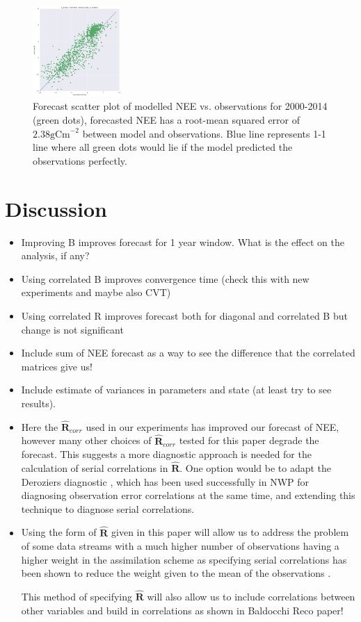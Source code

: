 \documentclass[11pt]{article}
\begin{document}
\begin{figure}[ht]
    \centering
    \includegraphics[width=0.3\textwidth]{b_edcr_corr_cor03_tau4_cutoff4_var05_forecast_scatter.png}
    \caption{Forecast scatter plot of modelled NEE vs. observations for 2000-2014 (green dots), forecasted NEE has a root-mean squared error of $2.38 \text{gCm}^{-2}$ between model and observations. Blue line represents 1-1 line where all green dots would lie if the model predicted the observations perfectly.}
    \label{fig:forecastscatedcBcorR}
\end{figure}



\section{Discussion}

\begin{itemize}
\item Improving B improves forecast for 1 year window. What is the effect on the analysis, if any?
\item Using correlated B improves convergence time (check this with new experiments and maybe also CVT)
\item Using correlated R improves forecast both for diagonal and correlated B but change is not significant 
\item Include sum of NEE forecast as a way to see the difference that the correlated matrices give us!
\item Include estimate of variances in parameters and state (at least try to see results).
\item Here the $\hat{\mathbf{R}}_{corr}$ used in our experiments has improved our forecast of NEE, however many other choices of $\hat{\mathbf{R}}_{corr}$ tested for this paper degrade the forecast. This suggests a more diagnostic approach is needed for the calculation of serial correlations in $\hat{\mathbf{R}}$. One option would be to adapt the Deroziers diagnostic \citep{desroziers2005diagnosis}, which has been used successfully in NWP for diagnosing observation error correlations at the same time, and extending this technique to diagnose serial correlations.
\item Using the form of $\hat{\mathbf{R}}$ given in this paper will allow us to address the problem of some data streams with a much higher number of observations having a higher weight in the assimilation scheme as specifying serial correlations has been shown to reduce the weight given to the mean of the observations \citep{jarvinen1999variational}.

This method of specifying $\hat{\mathbf{R}}$ will also allow us to include correlations between other variables and build in correlations as shown in Baldocchi Reco paper!
\end{itemize} 
\end{document}

